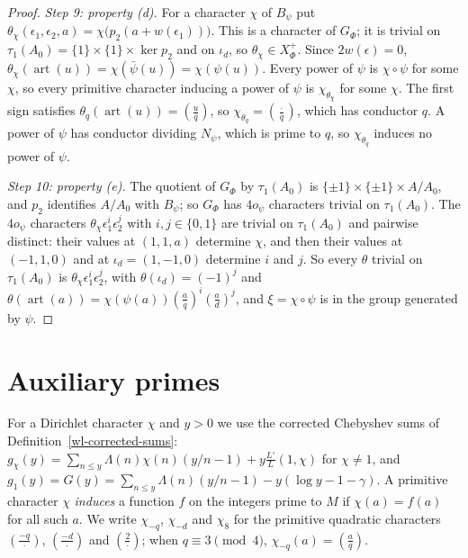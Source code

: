 \begin{proof}
\emph{Step 9: property (d).} For a character $\chi$ of $B_\psi$ put
$\theta_\chi(\epsilon_1,\epsilon_2,a)=\chi\bigl(p_2(a+w(\epsilon_1))\bigr)$. This is a character of
$G_\Phi$; it is trivial on $\tau_1(A_0)=\{1\}\times\{1\}\times\ker p_2$ and on $\iota_d$, so
$\theta_\chi\in X^+_\Phi$. Since $2w(\epsilon)=0$,
$\theta_\chi(\operatorname{art}(u))=\chi(\bar\psi(u))=\chi(\psi(u))$. Every power of $\psi$ is
$\chi\circ\psi$ for some $\chi$, so every primitive character inducing a power of $\psi$ is
$\chi_{\theta_\chi}$ for some $\chi$. The first sign satisfies
$\theta_q(\operatorname{art}(u))=\left(\frac uq\right)$, so $\chi_{\theta_q}=\left(\frac{\cdot}{q}\right)$,
which has conductor $q$. A power of $\psi$ has conductor dividing $N_\psi$, which is prime to $q$,
so $\chi_{\theta_q}$ induces no power of $\psi$.

\emph{Step 10: property (e).} The quotient of $G_\Phi$ by $\tau_1(A_0)$ is
$\{\pm1\}\times\{\pm1\}\times A/A_0$, and $p_2$ identifies $A/A_0$ with $B_\psi$; so $G_\Phi$ has
$4o_\psi$ characters trivial on $\tau_1(A_0)$. The $4o_\psi$ characters
$\theta_\chi\epsilon_1^i\epsilon_2^j$ with $i,j\in\{0,1\}$ are trivial on $\tau_1(A_0)$ and pairwise
distinct: their values at $(1,1,a)$ determine $\chi$, and then their values at $(-1,1,0)$ and at
$\iota_d=(1,-1,0)$ determine $i$ and $j$. So every $\theta$ trivial on $\tau_1(A_0)$ is
$\theta_\chi\epsilon_1^i\epsilon_2^j$, with $\theta(\iota_d)=(-1)^j$ and
$\theta(\operatorname{art}(a))=\chi(\psi(a))\left(\frac aq\right)^i\left(\frac ad\right)^j$, and
$\xi=\chi\circ\psi$ is in the group generated by $\psi$.
\end{proof}

\section{Auxiliary primes}\label{section-hf-auxiliary-primes}

For a Dirichlet character $\chi$ and $y>0$ we use the corrected Chebyshev sums of
Definition~\ref{wl-corrected-sums}: $g_\chi(y)=\sum_{n\leq y}\Lambda(n)\chi(n)(y/n-1)+y\frac{L'}{L}(1,\chi)$
for $\chi\neq1$, and $g_1(y)=G(y)=\sum_{n\leq y}\Lambda(n)(y/n-1)-y(\log y-1-\gamma)$. A primitive
character $\chi$ \emph{induces} a function $f$ on the integers prime to $M$ if $\chi(a)=f(a)$ for
all such $a$. We write $\chi_{-q}$, $\chi_{-d}$ and $\chi_8$ for the primitive quadratic characters
$\left(\frac{-q}{\cdot}\right)$, $\left(\frac{-d}{\cdot}\right)$ and $\left(\frac{2}{\cdot}\right)$;
when $q\equiv3\pmod4$, $\chi_{-q}(a)=\left(\frac aq\right)$.

